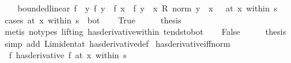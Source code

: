 \begin{isabellebody}
\ \ \ \ {\isacharparenleft}{\kern0pt}bounded{\isacharunderscore}{\kern0pt}linear\ f{\isacharprime}{\kern0pt}\ {\isasymand}\ {\isacharparenleft}{\kern0pt}{\isacharparenleft}{\kern0pt}{\isasymlambda}y{\isachardot}{\kern0pt}\ {\isacharparenleft}{\kern0pt}{\isacharparenleft}{\kern0pt}f\ y\ {\isacharminus}{\kern0pt}\ f\ x{\isacharparenright}{\kern0pt}\ {\isacharminus}{\kern0pt}\ f{\isacharprime}{\kern0pt}\ {\isacharparenleft}{\kern0pt}y\ {\isacharminus}{\kern0pt}\ x{\isacharparenright}{\kern0pt}{\isacharparenright}{\kern0pt}\ {\isacharslash}{\kern0pt}\isactrlsub R\ norm\ {\isacharparenleft}{\kern0pt}y\ {\isacharminus}{\kern0pt}\ x{\isacharparenright}{\kern0pt}{\isacharparenright}{\kern0pt}\ {\isasymlonglongrightarrow}\ {}{\isacharparenright}{\kern0pt}\ {\isacharparenleft}{\kern0pt}at\ x\ within\ s{\isacharparenright}{\kern0pt}{\isacharparenright}{\kern0pt}{\isachardoublequoteclose}\isanewline
%
\isadelimproof
%
\endisadelimproof
%
\isatagproof
{}\isamarkupfalse%
\ {\isacharparenleft}{\kern0pt}cases\ {\isachardoublequoteopen}at\ x\ within\ s\ {\isacharequal}{\kern0pt}\ bot{\isachardoublequoteclose}{\isacharparenright}{\kern0pt}\isanewline
\ \ \isamarkupfalse%
\ True\isanewline
\ \ \isamarkupfalse%
\ \isamarkupfalse%
\ {\isacharquery}{\kern0pt}thesis\isanewline
\ \ \ \ \isamarkupfalse%
\ {\isacharparenleft}{\kern0pt}metis\ {\isacharparenleft}{\kern0pt}no{\isacharunderscore}{\kern0pt}types{\isacharcomma}{\kern0pt}\ lifting{\isacharparenright}{\kern0pt}\ has{\isacharunderscore}{\kern0pt}derivative{\isacharunderscore}{\kern0pt}within\ tendsto{\isacharunderscore}{\kern0pt}bot{\isacharparenright}{\kern0pt}\isanewline
{}\isamarkupfalse%
\isanewline
\ \ \isamarkupfalse%
\ False\isanewline
\ \ \isamarkupfalse%
\ \isamarkupfalse%
\ {\isacharquery}{\kern0pt}thesis\isanewline
\ \ \isamarkupfalse%
\ {\isacharparenleft}{\kern0pt}simp\ add{\isacharcolon}{\kern0pt}\ Lim{\isacharunderscore}{\kern0pt}ident{\isacharunderscore}{\kern0pt}at\ has{\isacharunderscore}{\kern0pt}derivative{\isacharunderscore}{\kern0pt}def{\isacharparenright}{\kern0pt}\isanewline
{}\isamarkupfalse%
%
\endisatagproof
{\isafoldproof}%
%
\isadelimproof
\isanewline
%
\endisadelimproof
\isanewline
{}\isamarkupfalse%
\ has{\isacharunderscore}{\kern0pt}derivative{\isacharunderscore}{\kern0pt}iff{\isacharunderscore}{\kern0pt}norm{\isacharcolon}{\kern0pt}\isanewline
\ \ {\isachardoublequoteopen}{\isacharparenleft}{\kern0pt}f\ has{\isacharunderscore}{\kern0pt}derivative\ f{\isacharprime}{\kern0pt}{\isacharparenright}{\kern0pt}\ {\isacharparenleft}{\kern0pt}at\ x\ within\ s{\isacharparenright}{\kern0pt}\ {\isasymlongleftrightarrow}\isanewline

\end{isabellebody}
